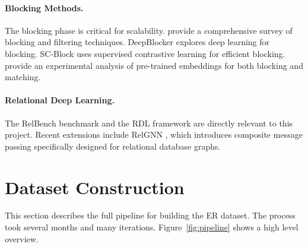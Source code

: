 \documentclass{article}
\begin{document}
\paragraph{Blocking Methods.}
The blocking phase is critical for scalability.
\citet{papadakis2019blocking} provide a comprehensive survey of blocking and filtering techniques.
DeepBlocker \citep{thirumuruganathan2021deepblocker} explores deep learning for blocking.
SC-Block \citep{scblock2023} uses supervised contrastive learning for efficient blocking.
\citet{papadakis2023pretrained} provide an experimental analysis of pre-trained embeddings for both blocking and matching.

\paragraph{Relational Deep Learning.}
The RelBench benchmark \citep{robinson2024relbench} and the RDL framework \citep{fey2024relational} are directly relevant to this project.
Recent extensions include RelGNN \citep{relgnn2025}, which introduces composite message passing specifically designed for relational database graphs.


\section{Dataset Construction}
\label{sec:dataset}

This section describes the full pipeline for building the ER dataset.
The process took several months and many iterations.
Figure~\ref{fig:pipeline} shows a high level overview.
\end{document}
